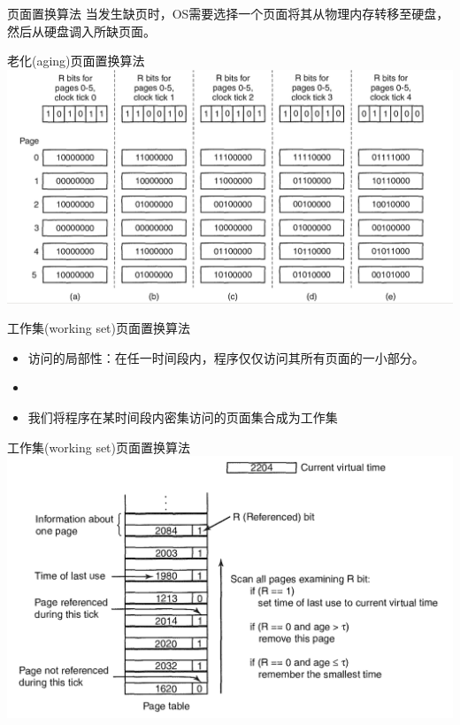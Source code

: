 \documentclass[xcolor=svgnames]{beamer}
\begin{document}
\begin{CJK*}{UTF8}{gbsn}
\begin{frame}{页面置换算法}
当发生缺页时，OS需要选择一个页面将其从物理内存转移至硬盘，然后从硬盘调入所缺页面。
\end{frame}

\begin{frame}{老化(aging)页面置换算法}
\includegraphics[width=1.0\textwidth]{aging.png}
\end{frame}

\begin{frame}{工作集(working set)页面置换算法}
\begin{itemize}
\item 访问的\alert{局部性}：在任一时间段内，程序仅仅访问其所有页面的一小部分。
\item[]
\item 我们将程序在某时间段内密集访问的页面集合成为\alert{工作集}
\end{itemize}
\end{frame}

\begin{frame}{工作集(working set)页面置换算法}
\includegraphics[width=1.0\textwidth]{ws.png}


\end{frame}
\end{CJK*}
\end{document}
